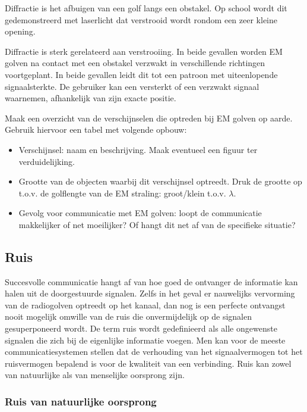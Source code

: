 Diffractie is het afbuigen van een golf langs een obstakel. Op school wordt dit gedemonstreerd met laserlicht dat verstrooid wordt rondom een zeer kleine opening.  

Diffractie is sterk gerelateerd aan verstrooiing. In beide gevallen worden EM golven na contact met een obstakel verzwakt in verschillende richtingen voortgeplant. In beide gevallen leidt dit tot een patroon met uiteenlopende signaalsterkte. De gebruiker kan een versterkt of een verzwakt signaal waarnemen, afhankelijk van zijn exacte positie.

\begin{oef}
Maak een overzicht van de verschijnselen die optreden bij EM golven op aarde. 
Gebruik hiervoor een tabel met volgende opbouw:
\begin{itemize}
    \item Verschijnsel: naam en beschrijving. Maak eventueel een figuur ter verduidelijking.
    \item Grootte van de objecten waarbij dit verschijnsel optreedt. Druk de grootte op t.o.v. de golflengte van de EM straling: groot/klein t.o.v. $\lambda$.
    \item Gevolg voor communicatie met EM golven: loopt de communicatie makkelijker of net moeilijker? Of hangt dit net af van de specifieke situatie?
\end{itemize}
\end{oef}

\subsection{Ruis}
Succesvolle communicatie hangt af van hoe goed de ontvanger de informatie kan halen uit de doorgestuurde signalen. Zelfs in het geval er nauwelijks vervorming van de radiogolven optreedt op het kanaal, dan nog is een perfecte ontvangst nooit mogelijk omwille van de ruis die onvermijdelijk op de signalen gesuperponeerd wordt. De term ruis wordt gedefinieerd als alle ongewenste signalen die zich bij de eigenlijke informatie voegen. Men kan voor de meeste communicatiesystemen stellen dat de verhouding van het signaalvermogen tot het ruisvermogen bepalend is voor de kwaliteit van een verbinding. Ruis kan zowel van natuurlijke als van menselijke oorsprong zijn.


\subsubsection{Ruis van natuurlijke oorsprong}

